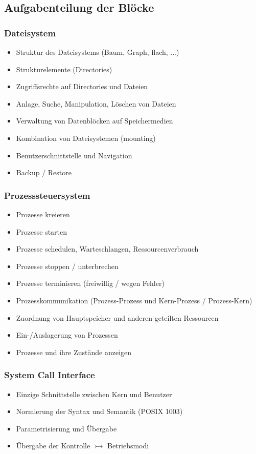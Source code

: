 \documentclass[a4paper, 10pt]{article}
\begin{document}
\subsection{Aufgabenteilung der Blöcke}
\subsubsection{Dateisystem}
\begin{itemize}
\item Struktur des Dateisystems (Baum, Graph, flach, ...)
\item Strukturelemente (Directories)
\item Zugriffsrechte auf Directories und Dateien
\item Anlage, Suche, Manipulation, Löschen von Dateien
\item Verwaltung von Datenblöcken auf Speichermedien
\item Kombination von Dateisystemen (mounting)
\item Benutzerschnittstelle und Navigation
\item Backup / Restore
\end{itemize}

\subsubsection{Prozesssteuersystem}
\begin{itemize}
\item Prozesse kreieren
\item Prozesse starten
\item Prozesse schedulen, Warteschlangen, Ressourcenverbrauch
\item Prozesse stoppen / unterbrechen
\item Prozesse terminieren (freiwillig / wegen Fehler)
\item Prozesskommunikation (Prozess-Prozess und Kern-Prozess / Prozess-Kern)
\item Zuordnung von Hauptspeicher und anderen geteilten Ressourcen
\item Ein-/Auslagerung von Prozessen
\item Prozesse und ihre Zustände anzeigen
\end{itemize}

\subsubsection{System Call Interface}
\begin{itemize}
\item Einzige Schnittstelle zwischen Kern und Benutzer
\item Normierung der Syntax und Semantik (POSIX 1003)
\item Parametrisierung und Übergabe
\item Übergabe der Kontrolle $\rightarrowtail$ Betriebsmodi
\end{itemize}
\end{document}
